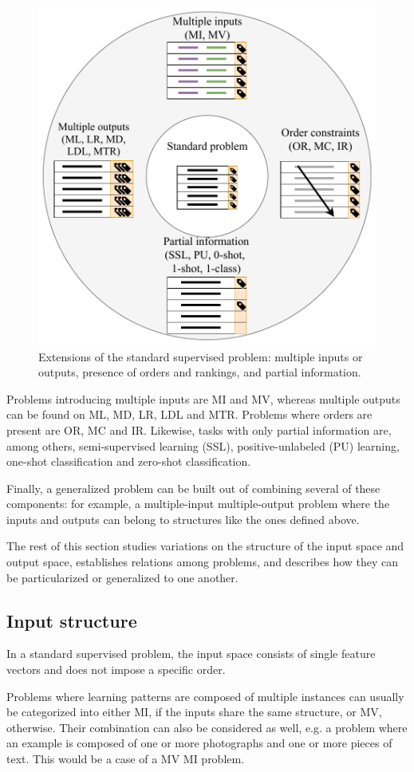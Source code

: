 \begin{figure}[ht]
\centering
\includegraphics[width=.65\textwidth]{problems2}
\caption{\label{p3fig.multiples}Extensions of the standard supervised problem: multiple inputs or outputs, presence of orders and rankings, and partial information.}
\end{figure}

Problems introducing multiple inputs are MI and MV, whereas multiple outputs can be found on ML, MD, LR, LDL and MTR. Problems where orders are present are OR, MC and IR. Likewise, tasks with only partial information are, among others, semi-supervised learning {(SSL), positive-unlabeled (PU) learning}, one-shot classification and zero-shot classification.

Finally, a generalized problem can be built out of combining several of these components: for example, a multiple-input multiple-output problem where the inputs and outputs can belong to structures like the ones defined above.

The rest of this section studies variations on the structure of the input space and output space, establishes relations among problems, and describes how they can be particularized or generalized to one another.

\subsection{Input structure}
\label{p3sec:multiinput}

In a standard supervised problem, the input space consists of single feature vectors and does not impose a specific order.

Problems where learning patterns are composed of multiple instances can usually be categorized into either MI, if the inputs share the same structure, or MV, otherwise. Their combination can also be considered as well, e.g. a problem where an example is composed of one or more photographs and one or more pieces of text. This would be a case of a MV MI problem.

